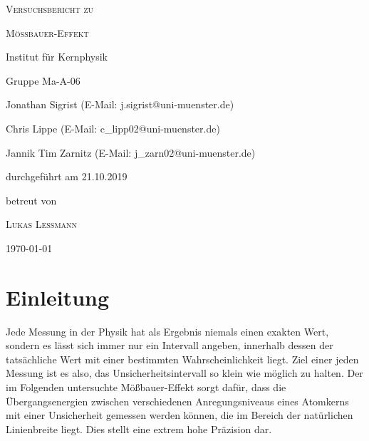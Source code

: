 \documentclass[
a4paper,                %
titlepage=firstiscover, %
captions=tableheading,  %
toc=bibliography,       %
toc=listof,             %
oneside,                %
automark,               %
12pt,                   %
english, ngerman,       %
parskip = half,         %
]{scrartcl}
\begin{document}
\pagestyle{scrplain}

\begin{titlepage}
	\centering
	{\scshape\LARGE Versuchsbericht zu \par}
	\vspace{1cm}
	{\scshape\huge Mößbauer-Effekt
		
		\vspace{0,3cm}
		
		\frqq Institut für Kernphysik\flqq}
	\vspace{2.5cm}
	
	{\LARGE Gruppe Ma-A-06\par}
	\vspace{0.5cm}
	{\large Jonathan Sigrist (E-Mail: j.sigrist@uni-muenster.de) \par}
	{\large Chris Lippe (E-Mail: c\_lipp02@uni-muenster.de) \par}
	{\large Jannik Tim Zarnitz (E-Mail: j\_zarn02@uni-muenster.de) \par}
	\vfill
	durchgeführt am 21.10.2019\par
	betreut von\par
	{\large \textsc{Lukas Leßmann} } \par
	
	\vfill
	
	{\large \today\par}
\end{titlepage}


\tableofcontents


\pagestyle{scrheadings}


\clearpage


\section{Einleitung}

Jede Messung in der Physik hat als Ergebnis niemals einen exakten Wert, sondern es lässt sich immer nur ein Intervall angeben, innerhalb dessen der tatsächliche Wert mit einer bestimmten Wahrscheinlichkeit liegt.\cite{1}
Ziel einer jeden Messung ist es also, das Unsicherheitsintervall so klein wie möglich zu halten.
Der im Folgenden untersuchte Mößbauer-Effekt sorgt dafür, dass die Übergangsenergien zwischen verschiedenen Anregungsniveaus eines Atomkerns mit einer Unsicherheit gemessen werden können, die im Bereich der natürlichen Linienbreite liegt.
Dies stellt eine extrem hohe Präzision dar.
\end{document}
